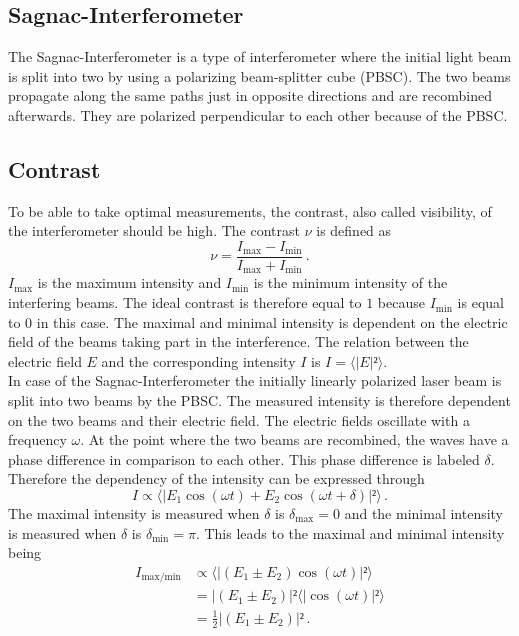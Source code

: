 \subsection{Sagnac-Interferometer}
\label{subsec:Sagnac_Interferometer}
The Sagnac-Interferometer is a type of interferometer where the initial light beam is split into two by using a polarizing beam-splitter 
cube (PBSC). The two beams propagate along the same paths just in opposite directions and are recombined afterwards. They are polarized 
perpendicular to each other because of the PBSC.

  \subsection{Contrast}
  To be able to take optimal measurements, the contrast, also called visibility, of the interferometer should be high. 
  The contrast $\nu$ is defined
   as 
  \begin{equation}
    \nu = \frac{I_{\text{max}}- I_{\text{min}}}{I_{\text{max}}+ I_{\text{min}}}\, .
    \label{eqn:contrast}
  \end{equation}
 $I_{\text{max}}$ is the maximum intensity and $I_{\text{min}}$ is the minimum intensity of the interfering beams. The ideal contrast is therefore equal to $1$ because
 $I_{\text{min}}$ is equal to $0$ in this case. The maximal and minimal intensity is dependent on the electric field of the beams taking 
 part in the interference. The relation between the electric field $E$ and the corresponding intensity $I$ is $I = \langle |E|² \rangle$. \\
 In case of the Sagnac-Interferometer the initially linearly polarized laser beam is split into two beams by the PBSC. The measured 
 intensity is therefore dependent on the two beams and their electric field. The electric fields oscillate with a frequency $\omega$. 
 At the point where the two beams are recombined, the waves have a phase difference in comparison to each other. This phase difference
 is labeled $\delta$. Therefore the dependency of the intensity can be expressed through
 \begin{equation*}
    I \propto \langle |E_1 \cos(\omega t) + E_2 \cos(\omega t + \delta)|²\rangle \, .
 \end{equation*}
 The maximal intensity is measured when $\delta$ is $\delta_{\text{max}} = 0$ and the minimal intensity is
 measured when $\delta$ is $\delta_{\text{min}} = \pi$. 
 This leads to the maximal and minimal intensity being 
 \begin{align*}
    I_{\text{max/min}} &\propto \langle |(E_1 \pm E_2) \cos(\omega t)|²\rangle \\
    &= |(E_1 \pm E_2)|² \langle |\cos(\omega t)|²\rangle \\
    &= \frac{1}{2} |(E_1 \pm E_2)|² \, .
 \end{align*}
